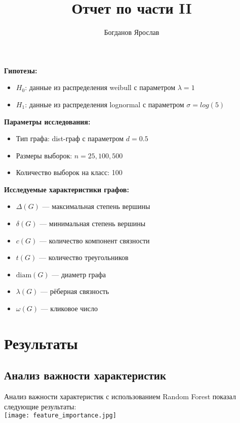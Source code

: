 \documentclass[12pt,a4paper]{article}
\title{Отчет по части II}
\author{Богданов Ярослав}
\date{} %
\begin{document}
\maketitle


\textbf{Гипотезы:}
\begin{itemize}
    \item $H_0$: данные из распределения weibull с параметром $\lambda = 1$
    \item $H_1$: данные из распределения lognormal с параметром $\sigma =log(5)$
\end{itemize}

\textbf{Параметры исследования:}
\begin{itemize}
    \item Тип графа: dist-граф с параметром $d = 0.5$
    \item Размеры выборок: $n = 25, 100, 500$
    \item Количество выборок на класс: 100
\end{itemize}

\textbf{Исследуемые характеристики графов:}
\begin{itemize}
    \item $\Delta(G)$ --- максимальная степень вершины
    \item $\delta(G)$ --- минимальная степень вершины  
    \item $c(G)$ --- количество компонент связности
    \item $t(G)$ --- количество треугольников
    \item $\text{diam}(G)$ --- диаметр графа
    \item $\lambda(G)$ --- рёберная связность
    \item $\omega(G)$ --- кликовое число
\end{itemize}

\section{Результаты}

\subsection{Анализ важности характеристик}

Анализ важности характеристик с использованием Random Forest показал следующие результаты:\\

\texttt{[image: feature\_importance.jpg]}
    
\end{document}

